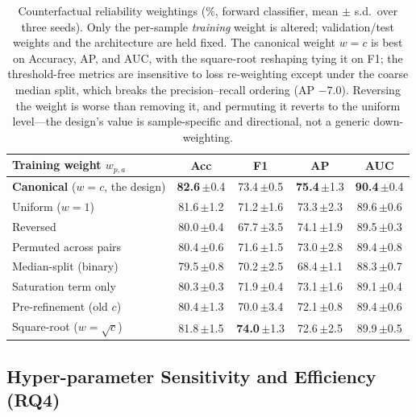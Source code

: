 \documentclass[11pt]{article}
\newcommand{\best}[1]{\textbf{#1}}
\begin{document}
\begin{table}[t]
\centering\small
\setlength{\tabcolsep}{7pt}
\newcommand{\pmsd}[1]{\,{\scriptsize$\pm$#1}}
\begin{tabular}{lcccc}
\toprule
\textbf{Training weight $w_{p,a}$} & \textbf{Acc} & \textbf{F1} & \textbf{AP} & \textbf{AUC} \\
\midrule
\textbf{Canonical} ($w{=}c$, the design) & \best{82.6}\pmsd{0.4} & 73.4\pmsd{0.5} & \best{75.4}\pmsd{1.3} & \best{90.4}\pmsd{0.4} \\
\midrule
Uniform ($w{=}1$)               & 81.6\pmsd{1.2} & 71.2\pmsd{1.6} & 73.3\pmsd{2.3} & 89.6\pmsd{0.6} \\
Reversed                        & 80.0\pmsd{0.4} & 67.7\pmsd{3.5} & 74.1\pmsd{1.9} & 89.5\pmsd{0.3} \\
Permuted across pairs           & 80.4\pmsd{0.6} & 71.6\pmsd{1.5} & 73.0\pmsd{2.8} & 89.4\pmsd{0.8} \\
Median-split (binary)           & 79.5\pmsd{0.8} & 70.2\pmsd{2.5} & 68.4\pmsd{1.1} & 88.3\pmsd{0.7} \\
Saturation term only            & 80.3\pmsd{0.3} & 71.9\pmsd{0.4} & 73.1\pmsd{1.6} & 89.1\pmsd{0.4} \\
Pre-refinement (old $c$)        & 80.4\pmsd{1.3} & 70.0\pmsd{3.4} & 72.1\pmsd{0.8} & 89.4\pmsd{0.6} \\
Square-root ($w{=}\sqrt{c}$)    & 81.8\pmsd{1.5} & \best{74.0}\pmsd{1.3} & 72.6\pmsd{2.5} & 89.9\pmsd{0.5} \\
\bottomrule
\end{tabular}
\caption{Counterfactual reliability weightings (\%, forward classifier, mean
$\pm$ s.d.\ over three seeds). Only the per-sample \emph{training} weight is
altered; validation/test weights and the architecture are held fixed. The
canonical weight $w{=}c$ is best on Accuracy, AP, and AUC, with the square-root
reshaping tying it on F1; the threshold-free metrics are insensitive to loss
re-weighting except under the coarse median split, which breaks the
precision--recall ordering (AP $-7.0$). Reversing the weight is worse than
removing it, and permuting it reverts to the uniform level---the design's value
is sample-specific and directional, not a generic down-weighting.}
\label{tab:cval}
\end{table}

\subsection{Hyper-parameter Sensitivity and Efficiency (RQ4)}
\label{sec:exp:hyper}
\end{document}
